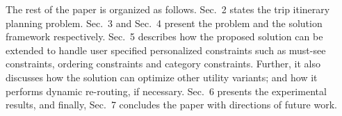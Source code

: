The rest of the paper is organized as follows. Sec.~2 states the trip itinerary planning problem. Sec.~3 and Sec.~4 present the \trip problem and the solution framework respectively. Sec.~5 describes how the proposed solution can be extended to handle user specified personalized constraints such as must-see constraints, ordering constraints and category constraints. Further, it also discusses how the \trip solution  can optimize other utility variants; and how it performs dynamic re-routing, if necessary. Sec.~6 presents the experimental results, and finally, Sec.~7 concludes the paper with directions of future work.
